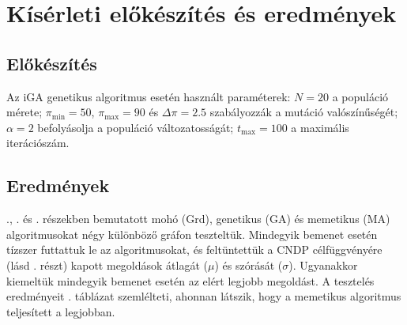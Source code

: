 \section{Kísérleti előkészítés és eredmények}


\subsection{Előkészítés}
Az iGA genetikus algoritmus esetén használt paraméterek:
$N = 20$ a populáció mérete;
$\pi_{\min} = 50$, $\pi_{\max} = 90$ és $\Delta \pi = 2.5$ szabályozzák a mutáció valószínűségét;
$\alpha = 2$ befolyásolja a populáció változatosságát;
$t_{\max} = 100$ a maximális iterációszám.


\subsection{Eredmények}
., . és . részekben bemutatott mohó (Grd), genetikus (GA) és memetikus (MA) algoritmusokat négy különböző gráfon teszteltük.
Mindegyik bemenet esetén tízszer futtattuk le az algoritmusokat, és feltüntettük a CNDP célfüggvényére (lásd . részt) kapott megoldások átlagát ($\mu$) és szórását ($\sigma$).
Ugyanakkor kiemeltük mindegyik bemenet esetén az elért legjobb megoldást.
A tesztelés eredményeit . táblázat szemlélteti, ahonnan látszik, hogy a memetikus algoritmus teljesített a legjobban.

\begin{table}[b]
  \centering
  \caption{
    A három algoritmus eredményei a CNDP célfüggvényére.
  }\label{tab:CNDP_RESULTS}
\end{table}
